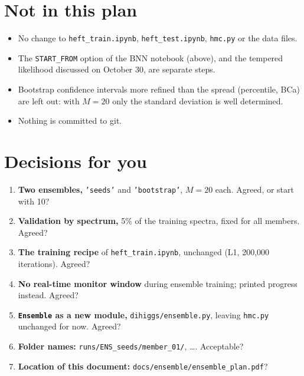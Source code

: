 \documentclass[11pt]{article}
\newcommand{\file}[1]{\nolinkurl{#1}}
\newcommand{\code}[1]{\texttt{#1}}
\begin{document}
\section{Not in this plan}
\begin{itemize}
  \item No change to \file{heft_train.ipynb}, \file{heft_test.ipynb}, \file{hmc.py} or the
    data files.
  \item The \code{START\_FROM} option of the BNN notebook (above), and the tempered
    likelihood discussed on October 30, are separate steps.
  \item Bootstrap confidence intervals more refined than the spread (percentile, BCa) are
    left out: with $M = 20$ only the standard deviation is well determined.
  \item Nothing is committed to git.
\end{itemize}

\section{Decisions for you}
\label{sec:decisions}

\begin{keyidea}
\begin{enumerate}
  \item \textbf{Two ensembles,} \code{'seeds'} and \code{'bootstrap'}, $M = 20$ each.
    Agreed, or start with 10?
  \item \textbf{Validation by spectrum,} 5\% of the training spectra, fixed for all
    members. Agreed?
  \item \textbf{The training recipe} of \file{heft_train.ipynb}, unchanged (L1, 200,000
    iterations). Agreed?
  \item \textbf{No real-time monitor window} during ensemble training; printed progress
    instead. Agreed?
  \item \textbf{\code{Ensemble} as a new module,} \file{dihiggs/ensemble.py}, leaving
    \file{hmc.py} unchanged for now. Agreed?
  \item \textbf{Folder names:} \file{runs/ENS_seeds/member_01/}, \ldots. Acceptable?
  \item \textbf{Location of this document:} \file{docs/ensemble/ensemble_plan.pdf}?
\end{enumerate}
\end{keyidea}
\end{document}
